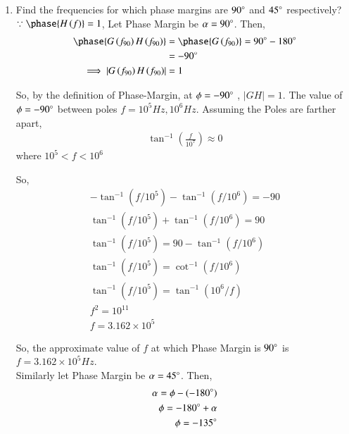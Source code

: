 \begin{enumerate}[label=\thesection.\arabic*.,ref=\thesection.\theenumi]
\item Find the frequencies for which phase margins are $90\degree$ and $45\degree$ respectively?\\
\solution $\because \phase{H\brak{f}} = 1$, 
Let Phase Margin be $\alpha = 90\degree$. Then,
\begin{align}
\phase{G\brak{f_{90}}H\brak{f_{90}}} &= \phase{G\brak{f_{90}}} = 90\degree - 180\degree
\\
&= -90\degree
\\
\implies \abs{G\brak{f_{90}}H\brak{f_{90}}} &=1
\end{align}

So, by the definition of Phase-Margin, at $\phi = -90\degree$ , $|GH| = 1 $.  The value of $\phi = -90\degree$ between poles $f=10^{5}Hz,10^{6}Hz$. Assuming the Poles are farther apart, 
\begin{align}
\tan^{-1}(\frac{f}{10^{7}}) \approx 0
\end{align}
where $10^{5} < f < 10^{6}$

So,
\begin{align}
-\tan^{-1}\left(f/10^{5}\right)-\tan^{-1}\left(f/10^{6}\right) = -90\\
\tan^{-1}\left(f/10^{5}\right)+\tan^{-1}\left(f/10^{6}\right) = 90\\
\tan^{-1}\left(f/10^{5}\right) = 90-\tan^{-1}\left(f/10^{6}\right)\\
\tan^{-1}\left(f/10^{5}\right) = \cot^{-1}\left(f/10^{6}\right)\\
\tan^{-1}\left(f/10^{5}\right) = \tan^{-1}\left(10^{6}/f\right)\\
f^{2} = 10^{11}\\
f = 3.162 \times 10^{5}
\end{align}

So, the approximate value of $f$ at which Phase Margin is $90\degree$ is $f=3.162 \times 10^{5} Hz$.\\

Similarly let Phase Margin be $\alpha = 45\degree$. Then,
\begin{align}
\alpha = \phi - (-180\degree)\\
\phi = -180\degree + \alpha\\
\phi = -135\degree
\end{align}


\end{enumerate}

